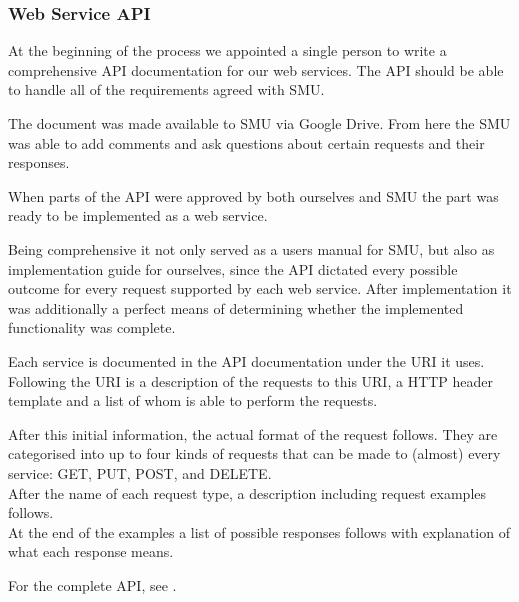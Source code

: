 \subsubsection{Web Service API}
At the beginning of the process we appointed a single person to write a comprehensive API documentation for our web services.
The API should be able to handle all of the requirements agreed with SMU.

The document was made available to SMU via Google Drive. From here the SMU was able to add comments and ask questions about certain requests and their responses.

When parts of the API were approved by both ourselves and SMU the part was ready to be implemented as a web service.

Being comprehensive it not only served as a users manual for SMU, but also as implementation guide for ourselves, since the API dictated every possible outcome for every request supported by each web service. After implementation it was additionally a perfect means of determining whether the implemented functionality was complete.

Each service is documented in the API documentation under the URI it uses. Following the URI is a description of the requests to this URI, a HTTP header template and a list of whom is able to perform the requests.

After this initial information, the actual format of the request follows. They are categorised into up to four kinds of requests that can be made to (almost) every service: GET, PUT, POST, and DELETE. \\
After the name of each request type, a description including request examples follows. \\
At the end of the examples a list of possible responses follows with explanation of what each response means.

For the complete API, see .